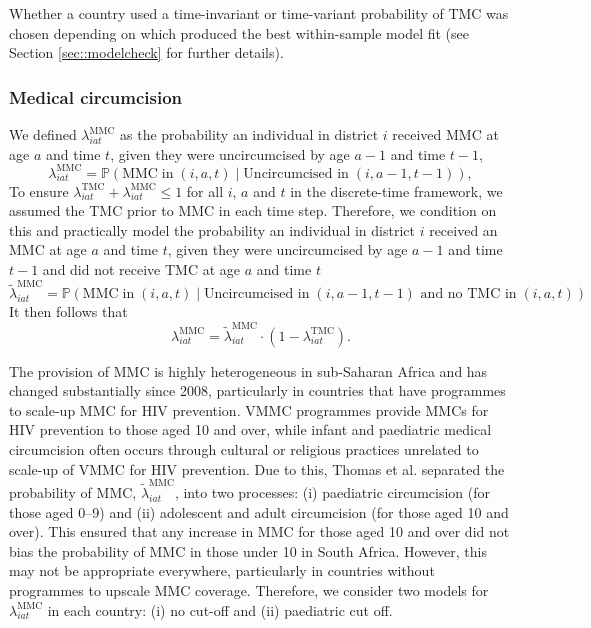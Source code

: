 \documentclass{article}
\begin{document}
\begin{appendix}
Whether a country used a time-invariant or time-variant probability of TMC was chosen depending on which produced the best within-sample model fit (see Section \ref{sec::modelcheck} for further details). 


\subsubsection*{Medical circumcision}


\noindent We defined $\lambda^{\text{MMC}}_{iat}$ as the probability an individual in district $i$ received MMC at age $a$ and time $t$, given they were uncircumcised by age $a-1$ and time $t-1$,  
\begin{equation*}
		\lambda^{\text{MMC}}_{iat} = \mathbb{P}(\text{MMC} \; \text{in} \; (i,a,t) \; | \; \text{Uncircumcised in} \; (i,a-1, t-1)),
\end{equation*}
To ensure $\lambda^{\text{TMC}}_{iat} + \lambda^{\text{MMC}}_{iat} \leq 1$ for all $i$, $a$ and $t$ in the discrete-time framework, we assumed the TMC prior to MMC in each time step. Therefore, we condition on this and practically model the probability an individual in district $i$ received an MMC at age $a$ and time $t$, given they were uncircumcised by age $a-1$ and time $t-1$ and did not receive TMC at age $a$ and time $t$
\begin{equation*}
		\tilde{\lambda}^{\text{MMC}}_{iat} = \mathbb{P}(\text{MMC} \; \text{in} \; (i,a,t) \; | \; \text{Uncircumcised in} \; (i,a-1, t-1) \text{ and no TMC in} \; (i,a, t))
\end{equation*}
It then follows that 
\begin{equation*}
		\lambda^{\text{MMC}}_{iat} = \tilde{\lambda}^{\text{MMC}}_{iat}\cdot (1-\lambda^{\text{TMC}}_{iat}).
\end{equation*}

The provision of MMC is highly heterogeneous in sub-Saharan Africa and has changed substantially since 2008, particularly in countries that have programmes to scale-up MMC for HIV prevention. VMMC programmes provide MMCs for HIV prevention to those aged 10 and over, while infant and paediatric medical circumcision often occurs through cultural or religious practices unrelated to scale-up of VMMC for HIV prevention. Due to this, Thomas et al. \cite{thomas2021multilevel} separated the probability of MMC, $\tilde{\lambda}^{\text{MMC}}_{iat}$, into two processes: (i) paediatric circumcision (for those aged 0--9) and (ii) adolescent and adult circumcision (for those aged 10 and over). This ensured that any increase in MMC for those aged 10 and over did not bias the probability of MMC in those under 10 in South Africa. However, this may not be appropriate everywhere, particularly in countries without programmes to upscale MMC coverage. Therefore, we consider two models for $\lambda^{\text{MMC}}_{iat}$ in each country: (i) no cut-off and (ii) paediatric cut off.


\end{appendix}
\end{document}

